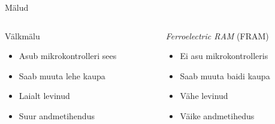 \documentclass[pdf]{beamer}
\begin{document}
\begin{frame}{Mälud}
    \begin{columns}[t]
        \begin{column}{0.46\textwidth}
            \begin{block}{Välkmälu}
                \begin{itemize}
                    \item Asub mikrokontrolleri sees
                    \item Saab muuta lehe kaupa
                    \item Laialt levinud
                    \item Suur andmetihendus
                \end{itemize}
            \end{block}
        \end{column}
        \begin{column}{0.46\textwidth}
            \begin{block}{\textit{Ferroelectric RAM} (FRAM)}
                \begin{itemize}
                    \item Ei asu mikrokontrolleris
                    \item Saab muuta baidi kaupa
                    \item Vähe levinud
                    \item Väike andmetihedus
                \end{itemize}
            \end{block}
        \end{column}
    \end{columns}
\end{frame}
\end{document}
